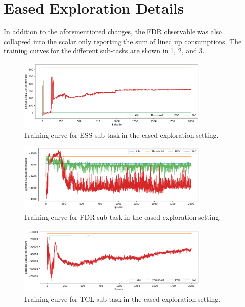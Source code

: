 \section{Eased Exploration Details} \label{sec:eased_exploration_details}
In addition to the aforementioned changes, the FDR observable was also collapsed into the scalar only reporting the sum of lined up consumptions. The training curves for the different sub-tasks are shown in \cref{fig:training_curve_scalar_ess}, \cref{fig:training_curve_scalar_fdr}, and  \cref{fig:training_curve_scalar_tcl}.
\begin{figure}[H]
    \centering
    \includegraphics[width=0.85\textwidth]{figures/training_curve_scalar_ess.png}
    \caption{Training curve for ESS sub-task in the eased exploration setting.}
    \label{fig:training_curve_scalar_ess}
\end{figure}
\begin{figure}[H]
    \centering
    \includegraphics[width=0.85\textwidth]{figures/training_curve_scalar_fdr.png}
    \caption{Training curve for FDR sub-task in the eased exploration setting.}
    \label{fig:training_curve_scalar_fdr}
\end{figure}
\begin{figure}[H]
    \centering
    \includegraphics[width=0.85\textwidth]{figures/training_curve_scalar_tcl.png}
    \caption{Training curve for TCL sub-task in the eased exploration setting.}
    \label{fig:training_curve_scalar_tcl}
\end{figure}

